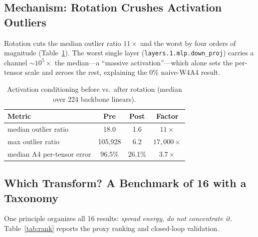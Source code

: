 \documentclass[conference]{IEEEtran}
\begin{document}
\subsection{Mechanism: Rotation Crushes Activation Outliers}
\label{sec:mech}

Rotation cuts the median outlier ratio $11\times$ and the worst by four orders of magnitude
(Table~\ref{tab:mech}). The worst single layer (\texttt{layers.1.mlp.down\_proj}) carries a
channel $\sim 10^5\times$ the median---a ``massive activation''---which alone sets the per-tensor
scale and zeroes the rest, explaining the 0\% naive-W4A4 result.

\begin{table}[h]\centering
\caption{Activation conditioning before vs.\ after rotation (median over 224 backbone linears).}
\label{tab:mech}
\begin{tabular}{lccc}
\toprule
Metric & Pre & Post & Factor \\
\midrule
median outlier ratio & 18.0 & 1.6 & $11\times$ \\
max outlier ratio & 105,928 & 6.2 & $17{,}000\times$ \\
median A4 per-tensor error & 96.5\% & 26.1\% & $3.7\times$ \\
\bottomrule
\end{tabular}
\end{table}

\subsection{Which Transform? A Benchmark of 16 with a Taxonomy}
\label{sec:zoo}

One principle organizes all 16 results: \emph{spread energy, do not concentrate it.}
Table~\ref{tab:rank} reports the proxy ranking and closed-loop validation.
\end{document}
